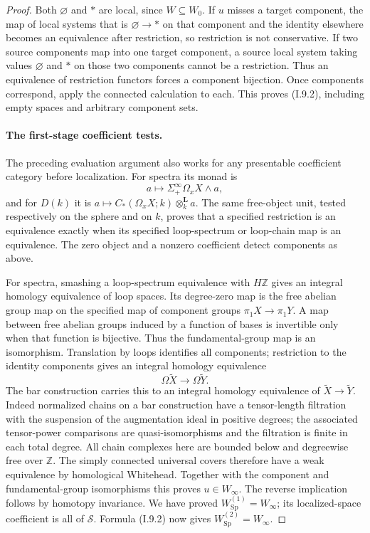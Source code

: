 \begin{proof}
Both $\varnothing$ and $*$ are local, since $W\subseteq W_0$. If $u$ misses a target component, the map of local systems that is $\varnothing\to *$ on that component and the identity elsewhere becomes an equivalence after restriction, so restriction is not conservative. If two source components map into one target component, a source local system taking values $\varnothing$ and $*$ on those two components cannot be a restriction. Thus an equivalence of restriction functors forces a component bijection. Once components correspond, apply the connected calculation to each. This proves (I.9.2), including empty spaces and arbitrary component sets.

\paragraph{The first-stage coefficient tests.}
The preceding evaluation argument also works for any presentable coefficient category before localization. For spectra its monad is
\[
 a\longmapsto\Sigma^\infty_+\Omega_xX\wedge a,
\]
and for $D(k)$ it is
$ a\longmapsto C_*(\Omega_xX;k)\otimes_k^{\mathbf L}a$.
The same free-object unit, tested respectively on the sphere and on $k$, proves that a specified restriction is an equivalence exactly when its specified loop-spectrum or loop-chain map is an equivalence. The zero object and a nonzero coefficient detect components as above.

For spectra, smashing a loop-spectrum equivalence with $H\mathbb Z$ gives an integral homology equivalence of loop spaces. Its degree-zero map is the free abelian group map on the specified map of component groups
$\pi_1X\to\pi_1Y$. A map between free abelian groups induced by a function of bases is invertible only when that function is bijective. Thus the fundamental-group map is an isomorphism. Translation by loops identifies all components; restriction to the identity components gives an integral homology equivalence
\[
 \Omega\widetilde X\longrightarrow\Omega\widetilde Y.
\]
The bar construction carries this to an integral homology equivalence of $\widetilde X\to\widetilde Y$. Indeed normalized chains on a bar construction have a tensor-length filtration with the suspension of the augmentation ideal in positive degrees; the associated tensor-power comparisons are quasi-isomorphisms and the filtration is finite in each total degree. All chain complexes here are bounded below and degreewise free over $\mathbb Z$. The simply connected universal covers therefore have a weak equivalence by homological Whitehead. Together with the component and fundamental-group isomorphisms this proves $u\in W_\infty$. The reverse implication follows by homotopy invariance. We have proved $W_{\operatorname{Sp}}^{(1)}=W_\infty$; its localized-space coefficient is all of $\mathcal S$. Formula (I.9.2) now gives $W_{\operatorname{Sp}}^{(2)}=W_\infty$.


\end{proof}
